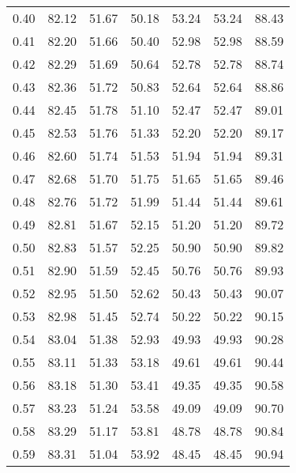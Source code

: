 \begin{tabular}{|c|c|c|c|c|c|c|}
      0.40 &     82.12 &     51.67 &      50.18 &   53.24 &      53.24 &         88.43 \\
      0.41 &     82.20 &     51.66 &      50.40 &   52.98 &      52.98 &         88.59 \\
      0.42 &     82.29 &     51.69 &      50.64 &   52.78 &      52.78 &         88.74 \\
      0.43 &     82.36 &     51.72 &      50.83 &   52.64 &      52.64 &         88.86 \\
      0.44 &     82.45 &     51.78 &      51.10 &   52.47 &      52.47 &         89.01 \\
      0.45 &     82.53 &     51.76 &      51.33 &   52.20 &      52.20 &         89.17 \\
      0.46 &     82.60 &     51.74 &      51.53 &   51.94 &      51.94 &         89.31 \\
      0.47 &     82.68 &     51.70 &      51.75 &   51.65 &      51.65 &         89.46 \\
      0.48 &     82.76 &     51.72 &      51.99 &   51.44 &      51.44 &         89.61 \\
      0.49 &     82.81 &     51.67 &      52.15 &   51.20 &      51.20 &         89.72 \\
      0.50 &     82.83 &     51.57 &      52.25 &   50.90 &      50.90 &         89.82 \\
      0.51 &     82.90 &     51.59 &      52.45 &   50.76 &      50.76 &         89.93 \\
      0.52 &     82.95 &     51.50 &      52.62 &   50.43 &      50.43 &         90.07 \\
      0.53 &     82.98 &     51.45 &      52.74 &   50.22 &      50.22 &         90.15 \\
      0.54 &     83.04 &     51.38 &      52.93 &   49.93 &      49.93 &         90.28 \\
      0.55 &     83.11 &     51.33 &      53.18 &   49.61 &      49.61 &         90.44 \\
      0.56 &     83.18 &     51.30 &      53.41 &   49.35 &      49.35 &         90.58 \\
      0.57 &     83.23 &     51.24 &      53.58 &   49.09 &      49.09 &         90.70 \\
      0.58 &     83.29 &     51.17 &      53.81 &   48.78 &      48.78 &         90.84 \\
      0.59 &     83.31 &     51.04 &      53.92 &   48.45 &      48.45 &         90.94 \\

\end{tabular}
